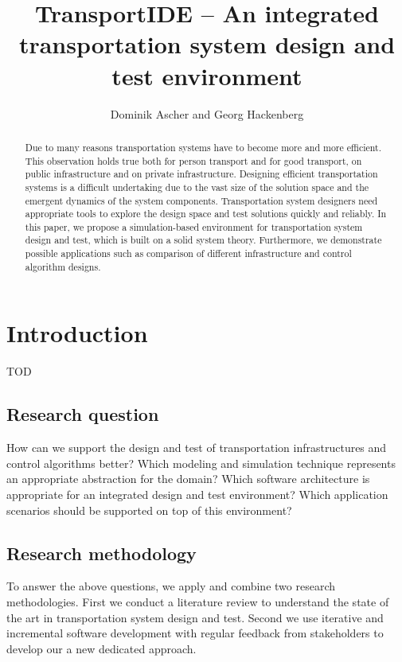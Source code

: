 \documentclass{IEEEtran}
\begin{document}
    \title{\textbf{TransportIDE} -- An integrated transportation system design and test environment}
    \author{Dominik Ascher and Georg Hackenberg}
    \maketitle
    
    \begin{abstract}
        Due to many reasons transportation systems have to become more and more efficient.
        This observation holds true both for person transport and for good transport, on public infrastructure and on private infrastructure.
        Designing efficient transportation systems is a difficult undertaking due to the vast size of the solution space and the emergent dynamics of the system components.
        Transportation system designers need appropriate tools to explore the design space and test solutions quickly and reliably.
        In this paper, we propose a simulation-based environment for transportation system design and test, which is built on a solid system theory.
        Furthermore, we demonstrate possible applications such as comparison of different infrastructure and control algorithm designs.
    \end{abstract}
    
    \section{Introduction}
    \label{sec:intro}
    TOD

    \subsection{Research question}
    How can we support the design and test of transportation infrastructures and control algorithms better?
    Which modeling and simulation technique represents an appropriate abstraction for the domain?
    Which software architecture is appropriate for an integrated design and test environment?
    Which application scenarios should be supported on top of this environment?

    \subsection{Research methodology}
    To answer the above questions, we apply and combine two research methodologies.
    First we conduct a literature review to understand the state of the art in transportation system design and test.
    Second we use iterative and incremental software development with regular feedback from stakeholders to develop our a new dedicated approach.
\end{document}
